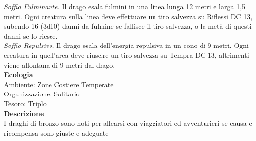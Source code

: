 \begin{multicols}{2}
\emph{Soffio Fulminante.} Il drago esala fulmini in una linea lunga 12 metri e larga 1,5 metri. Ogni creatura sulla linea deve effettuare un tiro salvezza su Riflessi DC  13, subendo 16 (3d10) danni da fulmine se fallisce il tiro salvezza, o la metà di questi danni se lo riesce.\\
\emph{Soffio Repulsivo.} Il drago esala dell'energia repulsiva in un cono di 9 metri. Ogni creatura in quell'area deve riuscire un tiro salvezza su Tempra DC  13, altrimenti viene allontana di 9 metri dal drago.\\
\textbf{Ecologia}\\
Ambiente: Zone Costiere Temperate\\
Organizzazione: Solitario\\
Tesoro: Triplo\\
\textbf{Descrizione}\\
I draghi di bronzo sono noti per allearsi con viaggiatori ed avventurieri se causa e ricompensa sono giuste e adeguate\\


\end{multicols}
